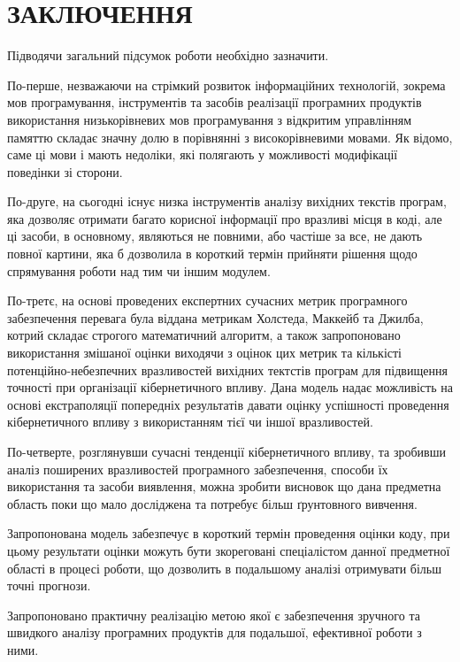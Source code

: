 \chapter*{ЗАКЛЮЧЕННЯ}
\label{5decision::doc}\label{5decision:id1}

Підводячи загальний підсумок роботи необхідно зазначити.

По-перше, незважаючи на стрімкий розвиток інформаційних технологій, зокрема мов програмування, інструментів та засобів реалізації програмних продуктів використання низькорівневих мов програмування з відкритим управлінням памяттю складає значну долю в порівнянні з високорівневими мовами. Як відомо, саме ці мови і мають недоліки, які полягають у можливості модифікації поведінки зі сторони.

По-друге, на сьогодні існує низка інструментів аналізу вихідних текстів програм, яка дозволяє отримати багато корисної інформації про вразливі місця в коді, але ці засоби, в основному, являються не повними, або частіше за все, не дають повної картини, яка б дозволила в короткий термін прийняти рішення щодо спрямування роботи над тим чи іншим модулем.

По-третє, на основі проведених експертних сучасних метрик програмного забезпечення  перевага була віддана метрикам Холстеда, Маккейб та Джилба, котрий складає строгого математичний алгоритм, а також запропоновано використання змішаної оцінки виходячи з оцінок цих метрик та кількісті потенційно-небезпечних вразливостей вихідних тектстів програм для підвищення точності при організації кібернетичного впливу. Дана модель надає можливість на основі екстраполяції попередніх результатів давати оцінку успішності проведення кібернетичного впливу з використанням тієї чи іншої вразливостей.

По-четверте, розглянувши сучасні тенденції кібернетичного впливу, та зробивши аналіз поширених вразливостей програмного забезпечення, способи їх використання та засоби виявлення, можна зробити висновок що дана предметна область поки що мало досліджена та потребує більш ґрунтовного вивчення.

Запропонована модель забезпечує в короткий термін проведення оцінки коду, при цьому результати оцінки можуть бути зкореговані спеціалістом данної предметної області в процесі роботи, що дозволить в подальшому аналізі отримувати більш точні прогнози.

Запропоновано практичну реалізацію метою якої є забезпечення зручного та швидкого аналізу програмних продуктів для подальшої, ефективної роботи з ними.